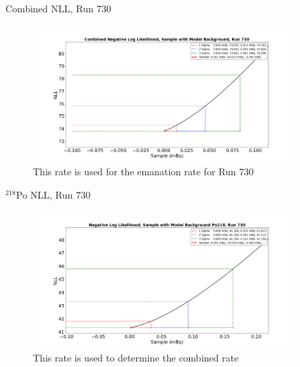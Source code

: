 \documentclass[aspectratio=169]{beamer}
\begin{document}
\begin{frame}{Combined NLL, Run 730}
    \begin{figure}
        \begin{center}
            \includegraphics[width=0.9\textwidth]
            {assets/730/comNLL.png}
            \caption{This rate is used for the emanation rate for Run 730}
        \end{center}
    \end{figure}
\end{frame}

\begin{frame}{$^{218}$Po NLL, Run 730}
    \begin{figure}
        \begin{center}
            \includegraphics[width=0.9\textwidth]
            {assets/730/NLL218.png}
            \caption{This rate is used to determine the combined rate}
        \end{center}
    \end{figure}
\end{frame}
\end{document}
